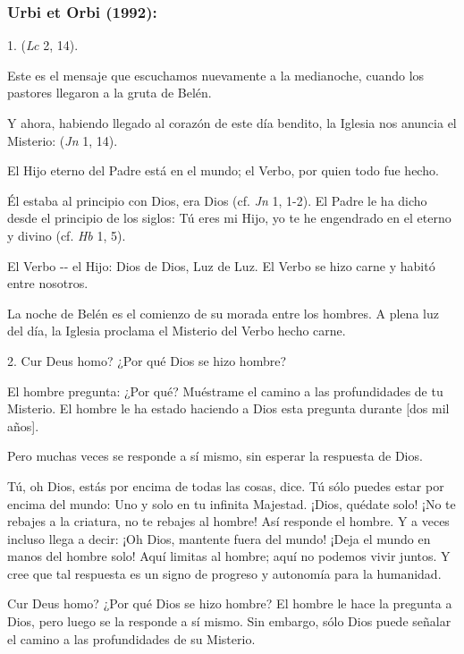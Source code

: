 \begin{body}
	\subsubsection{Urbi et Orbi (1992): }
	
	\begin{body}
		1.  (\emph{Lc} 2, 14).
		
		Este es el mensaje que escuchamos nuevamente a la medianoche, cuando los pastores llegaron a la gruta de Belén.
		
		Y ahora, habiendo llegado al corazón de este día bendito, la Iglesia nos anuncia el Misterio:  (\emph{Jn} 1, 14).
		
		El Hijo eterno del Padre está en el mundo; el Verbo, por quien todo fue hecho.
		
		Él estaba al principio con Dios, era Dios (cf. \emph{Jn} 1, 1-2). El Padre le ha dicho desde el principio de los siglos: Tú eres mi Hijo, yo te he engendrado en el  eterno y divino (cf. \emph{Hb} 1, 5).
		
		El Verbo -\/- el Hijo: Dios de Dios, Luz de Luz. El Verbo se hizo carne y habitó entre nosotros.
		
		La noche de Belén es el comienzo de su morada entre los hombres. A plena luz del día, la Iglesia proclama el Misterio del Verbo hecho carne.
		
		2. Cur Deus homo? ¿Por qué Dios se hizo hombre?
		
		El hombre pregunta: ¿Por qué? Muéstrame el camino a las profundidades de tu Misterio. El hombre le ha estado haciendo a Dios esta pregunta durante {[}dos mil años{]}.
		
		Pero muchas veces se responde a sí mismo, sin esperar la respuesta de Dios.
		
		Tú, oh Dios, estás por encima de todas las cosas, dice. Tú sólo puedes estar por encima del mundo: Uno y solo en tu infinita Majestad. ¡Dios, quédate solo! ¡No te rebajes a la criatura, no te rebajes al hombre! Así responde el hombre. Y a veces incluso llega a decir: ¡Oh Dios, mantente fuera del mundo! ¡Deja el mundo en manos del hombre solo! Aquí limitas al hombre; aquí no podemos vivir juntos. Y cree que tal respuesta es un signo de progreso y autonomía para la humanidad.
		
		Cur Deus homo? ¿Por qué Dios se hizo hombre? El hombre le hace la pregunta a Dios, pero luego se la responde a sí mismo. Sin embargo, sólo Dios puede señalar el camino a las profundidades de su Misterio.
		

\end{body}
\end{body}
